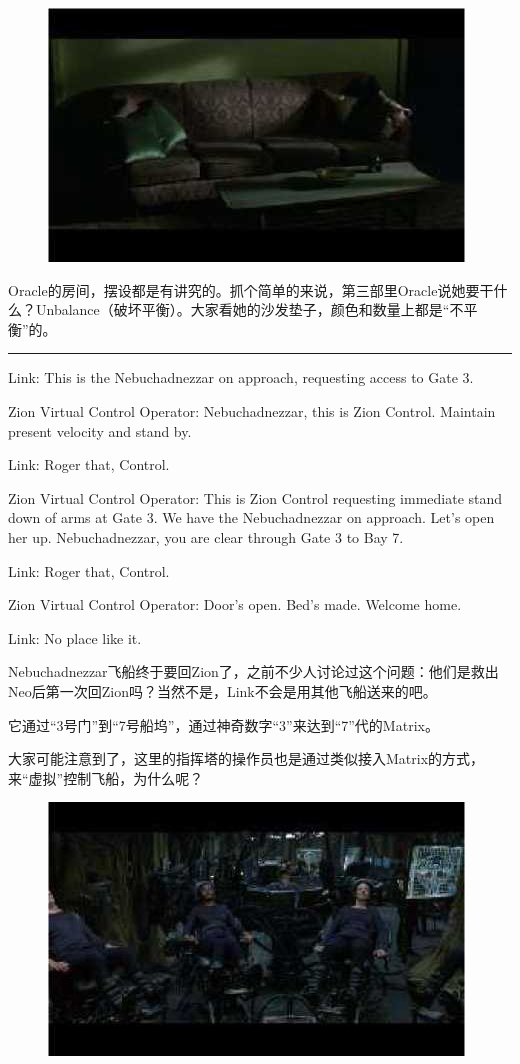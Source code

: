 \documentclass{ctexart}
\newcommand{\myparsep}{\noindent \rule[0.5ex]{\linewidth}{1pt}}
\newenvironment{myquote}{\color{green} \setlength{\leftskip}{6em} \setlength{\rightskip}{4em} \setlength{\parindent}{-2em}}{\par}
\begin{document}
\begin{figure}[htb]
\centering
\includegraphics[width=0.5\linewidth]{fig/read_reloaded-30}
\end{figure}

Oracle的房间，摆设都是有讲究的。抓个简单的来说，第三部里Oracle说她要干什么？Unbalance（破坏平衡）。大家看她的沙发垫子，颜色和数量上都是“不平衡”的。

\myparsep

\begin{myquote}
Link: This is the Nebuchadnezzar on approach, requesting access to Gate 3.

Zion Virtual Control Operator: Nebuchadnezzar, this is Zion Control. Maintain present velocity and stand by.

Link: Roger that, Control.

Zion Virtual Control Operator: This is Zion Control requesting immediate stand down of arms at Gate 3. We have the Nebuchadnezzar on approach. Let's open her up. Nebuchadnezzar, you are clear through Gate 3 to Bay 7.

Link: Roger that, Control.

Zion Virtual Control Operator: Door's open. Bed's made. Welcome home.

Link: No place like it.
\end{myquote}

Nebuchadnezzar飞船终于要回Zion了，之前不少人讨论过这个问题：他们是救出Neo后第一次回Zion吗？当然不是，Link不会是用其他飞船送来的吧。

它通过“3号门”到“7号船坞”，通过神奇数字“3”来达到“7”代的Matrix。

大家可能注意到了，这里的指挥塔的操作员也是通过类似接入Matrix的方式，来“虚拟”控制飞船，为什么呢？

\begin{figure}[htb]
\centering
\includegraphics[width=0.5\linewidth]{fig/read_reloaded-31}
\end{figure}
\end{document}
